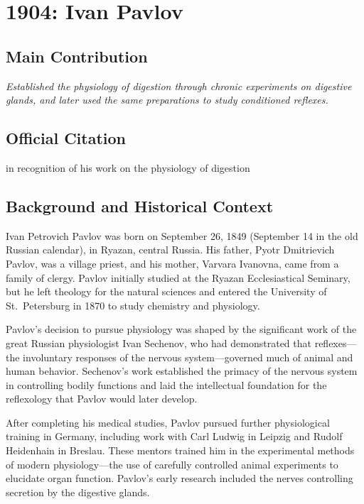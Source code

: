 \chapter[1904 --- Pavlov]{1904: Ivan Pavlov}
\label{ch:1904_ivanpavlov}

\section*{Main Contribution}

\textit{Established the physiology of digestion through chronic experiments on digestive glands, and later used the same preparations to study conditioned reflexes.}\cite{nobel-1904,lecture-1904}

\section{Official Citation}

in recognition of his work on the physiology of digestion

\section{Background and Historical Context}

Ivan Petrovich Pavlov was born on September 26, 1849 (September 14 in the old Russian calendar), in Ryazan, central Russia. His father, Pyotr Dmitrievich Pavlov, was a village priest, and his mother, Varvara Ivanovna, came from a family of clergy. Pavlov initially studied at the Ryazan Ecclesiastical Seminary, but he left theology for the natural sciences and entered the University of St.\ Petersburg in 1870 to study chemistry and physiology.\cite{pavlov-biography}

Pavlov's decision to pursue physiology was shaped by the significant work of the great Russian physiologist Ivan Sechenov, who had demonstrated that reflexes---the involuntary responses of the nervous system---governed much of animal and human behavior. Sechenov's work established the primacy of the nervous system in controlling bodily functions and laid the intellectual foundation for the reflexology that Pavlov would later develop.

After completing his medical studies, Pavlov pursued further physiological training in Germany, including work with Carl Ludwig in Leipzig and Rudolf Heidenhain in Breslau. These mentors trained him in the experimental methods of modern physiology---the use of carefully controlled animal experiments to elucidate organ function. Pavlov's early research included the nerves controlling secretion by the digestive glands.\cite{pavlov-history}

